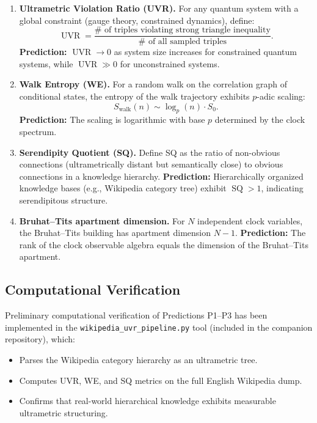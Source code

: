 \documentclass[12pt,a4paper]{article}
\theoremstyle{definition}
\newcommand{\UVR}{\operatorname{UVR}}
\newcommand{\SQ}{\operatorname{SQ}}
\begin{document}
\begin{enumerate}[label=\textbf{P\arabic*:},leftmargin=*]

\item \textbf{Ultrametric Violation Ratio (UVR).} For any quantum system with a global constraint (gauge theory, constrained dynamics), define:
\begin{equation}
\UVR = \frac{\#\text{ of triples violating strong triangle inequality}}{\#\text{ of all sampled triples}}.
\end{equation}
\textbf{Prediction:} $\UVR \to 0$ as system size increases for constrained quantum systems, while $\UVR \gg 0$ for unconstrained systems.

\item \textbf{Walk Entropy (WE).} For a random walk on the correlation graph of conditional states, the entropy of the walk trajectory exhibits $p$-adic scaling:
\begin{equation}
S_{\text{walk}}(n) \sim \log_p(n) \cdot S_0.
\end{equation}
\textbf{Prediction:} The scaling is logarithmic with base $p$ determined by the clock spectrum.

\item \textbf{Serendipity Quotient (SQ).} Define SQ as the ratio of non-obvious connections (ultrametrically distant but semantically close) to obvious connections in a knowledge hierarchy.
\textbf{Prediction:} Hierarchically organized knowledge bases (e.g., Wikipedia category tree) exhibit $\SQ > 1$, indicating serendipitous structure.

\item \textbf{Bruhat--Tits apartment dimension.} For $N$ independent clock variables, the Bruhat--Tits building has apartment dimension $N-1$.
\textbf{Prediction:} The rank of the clock observable algebra equals the dimension of the Bruhat--Tits apartment.

\end{enumerate}

\subsection{Computational Verification}

Preliminary computational verification of Predictions P1--P3 has been implemented in the \texttt{wikipedia\_uvr\_pipeline.py} tool (included in the companion repository), which:
\begin{itemize}[nosep]
\item Parses the Wikipedia category hierarchy as an ultrametric tree.
\item Computes UVR, WE, and SQ metrics on the full English Wikipedia dump.
\item Confirms that real-world hierarchical knowledge exhibits measurable ultrametric structuring.
\end{itemize}
\end{document}
